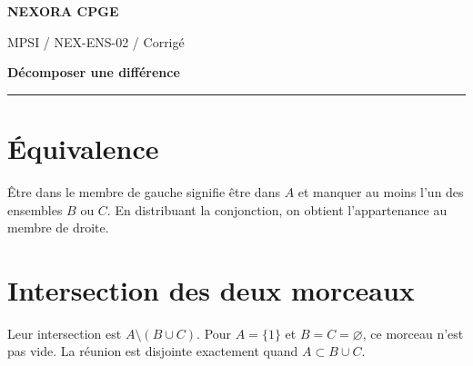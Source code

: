 \documentclass[11pt,a4paper]{article}
\begin{document}
{\small\bfseries\color{nexorablue} NEXORA CPGE}\par
{\small MPSI / NEX-ENS-02 / Corrigé}\par
{\LARGE\bfseries Décomposer une différence}\par
\vspace{0.25em}\hrule\vspace{0.6em}

\section*{Équivalence}
Être dans le membre de gauche signifie être dans $A$ et manquer au moins l’un des ensembles $B$ ou $C$. En distribuant la conjonction, on obtient l’appartenance au membre de droite.

\section*{Intersection des deux morceaux}
Leur intersection est $A\setminus(B\cup C)$. Pour $A=\{1\}$ et $B=C=\varnothing$, ce morceau n’est pas vide. La réunion est disjointe exactement quand $A\subset B\cup C$.
\end{document}
